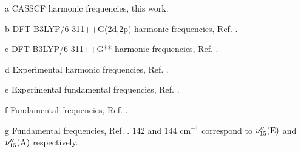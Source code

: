 \begin{center}
\begin{threeparttable}
\begin{tablenotes}
\footnotesize
\item[a]CASSCF harmonic frequencies, this work.
\item[b]DFT B3LYP/6-311++G(2d,2p) harmonic frequencies, Ref. .
\item[c]DFT B3LYP/6-311++G** harmonic frequencies, Ref. .
\item[d]Experimental harmonic frequencies, Ref. .
\item[e]Experimental fundamental frequencies, Ref. .
\item[f]Fundamental frequencies, Ref. .
\item[g]Fundamental frequencies, Ref. .  142 and 144 cm$^{-1}$ correspond to
$\nu^{\prime\prime}_{15}({\rm E})$ and $\nu^{\prime\prime}_{15}({\rm A})$ respectively.
\end{tablenotes}
\end{threeparttable}
\end{center}
